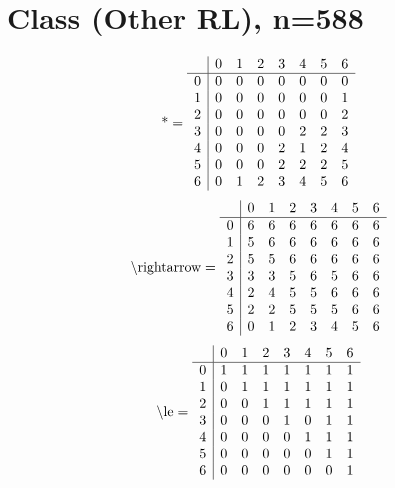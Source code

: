 \documentclass[11pt]{article}
\begin{document}
\section{Class (Other RL), n=588}
\[\text{*} = 
\begin{array}{r | r r r r r r r}
 & 0 & 1 & 2 & 3 & 4 & 5 & 6 \\ \hline
0 & 0 & 0 & 0 & 0 & 0 & 0 & 0 \\
1 & 0 & 0 & 0 & 0 & 0 & 0 & 1 \\
2 & 0 & 0 & 0 & 0 & 0 & 0 & 2 \\
3 & 0 & 0 & 0 & 0 & 2 & 2 & 3 \\
4 & 0 & 0 & 0 & 2 & 1 & 2 & 4 \\
5 & 0 & 0 & 0 & 2 & 2 & 2 & 5 \\
6 & 0 & 1 & 2 & 3 & 4 & 5 & 6 \\
\end{array}
\]
\[\text{\textbackslash rightarrow} = 
\begin{array}{r | r r r r r r r}
 & 0 & 1 & 2 & 3 & 4 & 5 & 6 \\ \hline
0 & 6 & 6 & 6 & 6 & 6 & 6 & 6 \\
1 & 5 & 6 & 6 & 6 & 6 & 6 & 6 \\
2 & 5 & 5 & 6 & 6 & 6 & 6 & 6 \\
3 & 3 & 3 & 5 & 6 & 5 & 6 & 6 \\
4 & 2 & 4 & 5 & 5 & 6 & 6 & 6 \\
5 & 2 & 2 & 5 & 5 & 5 & 6 & 6 \\
6 & 0 & 1 & 2 & 3 & 4 & 5 & 6 \\
\end{array}
\]
\[\text{\textbackslash le} = 
\begin{array}{r | r r r r r r r}
 & 0 & 1 & 2 & 3 & 4 & 5 & 6 \\ \hline
0 & 1 & 1 & 1 & 1 & 1 & 1 & 1 \\
1 & 0 & 1 & 1 & 1 & 1 & 1 & 1 \\
2 & 0 & 0 & 1 & 1 & 1 & 1 & 1 \\
3 & 0 & 0 & 0 & 1 & 0 & 1 & 1 \\
4 & 0 & 0 & 0 & 0 & 1 & 1 & 1 \\
5 & 0 & 0 & 0 & 0 & 0 & 1 & 1 \\
6 & 0 & 0 & 0 & 0 & 0 & 0 & 1 \\
\end{array}
\]
\end{document}
